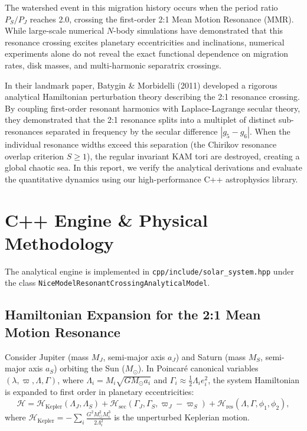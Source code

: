\documentclass[11pt,a4paper]{article}
\begin{document}
The watershed event in this migration history occurs when the period ratio $P_S / P_J$ reaches 2.0, crossing the first-order 2:1 Mean Motion Resonance (MMR). While large-scale numerical $N$-body simulations have demonstrated that this resonance crossing excites planetary eccentricities and inclinations, numerical experiments alone do not reveal the exact functional dependence on migration rates, disk masses, and multi-harmonic separatrix crossings.

In their landmark paper, Batygin \& Morbidelli (2011) developed a rigorous analytical Hamiltonian perturbation theory describing the 2:1 resonance crossing. By coupling first-order resonant harmonics with Laplace-Lagrange secular theory, they demonstrated that the 2:1 resonance splits into a multiplet of distinct sub-resonances separated in frequency by the secular difference $|g_5 - g_6|$. When the individual resonance widths exceed this separation (the Chirikov resonance overlap criterion $S \ge 1$), the regular invariant KAM tori are destroyed, creating a global chaotic sea. In this report, we verify the analytical derivations and evaluate the quantitative dynamics using our high-performance C++ astrophysics library.

\section{C++ Engine \& Physical Methodology}
The analytical engine is implemented in \texttt{cpp/include/solar\_system.hpp} under the class \linebreak \texttt{NiceModelResonantCrossingAnalyticalModel}.

\subsection{Hamiltonian Expansion for the 2:1 Mean Motion Resonance}
Consider Jupiter (mass $M_J$, semi-major axis $a_J$) and Saturn (mass $M_S$, semi-major axis $a_S$) orbiting the Sun ($M_\odot$). In Poincaré canonical variables $(\lambda, \varpi, \Lambda, \Gamma)$, where $\Lambda_i = M_i \sqrt{G M_\odot a_i}$ and $\Gamma_i \approx \frac{1}{2} \Lambda_i e_i^2$, the system Hamiltonian is expanded to first order in planetary eccentricities:
\begin{equation}
\mathcal{H} = \mathcal{H}_{\text{Kepler}}(\Lambda_J, \Lambda_S) + \mathcal{H}_{\text{sec}}(\Gamma_J, \Gamma_S, \varpi_J - \varpi_S) + \mathcal{H}_{\text{res}}(\Lambda, \Gamma, \phi_1, \phi_2),
\end{equation}
where $\mathcal{H}_{\text{Kepler}} = -\sum_{i} \frac{G^2 M_\odot^2 M_i^3}{2 \Lambda_i^2}$ is the unperturbed Keplerian motion.
\end{document}
